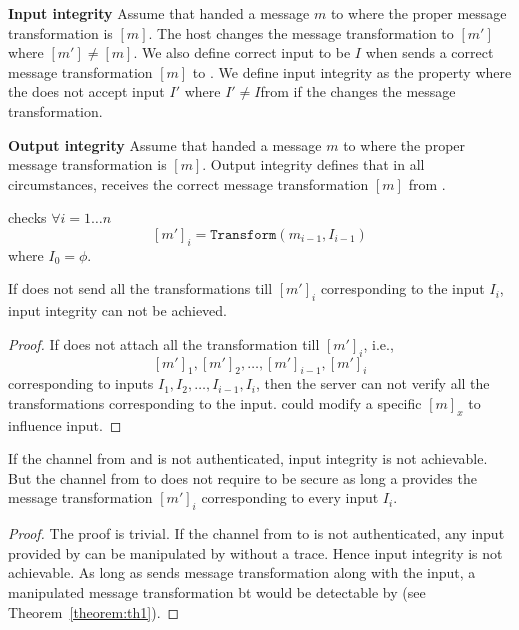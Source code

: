 \begin{definition}{\textbf{Input integrity}}
\label{def:inputIntegrity}
Assume that \server handed a message $m$ to \host where the proper message transformation is $[m]$. The host changes the message transformation to $[m']$ where $[m']\neq [m]$. We also define correct \user input to be $I$ when \host sends a correct message transformation $[m]$ to \user. We define input integrity as the property where the \server does not accept input $I'$ where $I'\neq I$from \user if the \host changes the message transformation.
\end{definition}

\begin{definition}{\textbf{Output integrity}}
\label{def:outputIntegrity}
Assume that \server handed a message $m$ to \host where the proper message transformation is $[m]$. Output integrity defines that in all circumstances, \user receives the correct message transformation $[m]$ from \host.
\end{definition}

 \server checks $\forall i=1\ldots n$ $$[m']_i = \texttt{Transform}(m_{i-1}, I_{i-1})$$ where $I_0=\phi$.

\begin{lemma}
\label{theorem:th1}
If \user does not send all the transformations till $[m']_i$ corresponding to the input $I_i$, input integrity can not be achieved. 
\end{lemma}

\begin{proof}
If \user does not attach all the transformation till $[m']_i$, i.e., $$[m']_1, [m']_2, \ldots, [m']_{i-1}, [m']_i$$  corresponding to inputs $I_1, I_2,\ldots, I_{i-1}, I_i$, then the server can not verify all the transformations corresponding to the input. \host could modify a specific $[m]_x$ to influence \user input.
\end{proof}

\begin{lemma}
\label{theorem:th2}
If the channel from \user and \server is not authenticated, input integrity is not achievable. But the channel from \server to \user does not require to be secure as long a \user provides the message transformation $[m']_i$ corresponding to every input $I_i$.
\end{lemma}

\begin{proof}
The proof is trivial. If the channel from \user to \server is not authenticated, any input provided by \user can be manipulated by \host without a trace. Hence input integrity is not achievable. As long as \user sends message transformation along with the input, a manipulated message transformation bt \host would be detectable by \server (see Theorem~\ref{theorem:th1}).
\end{proof}

